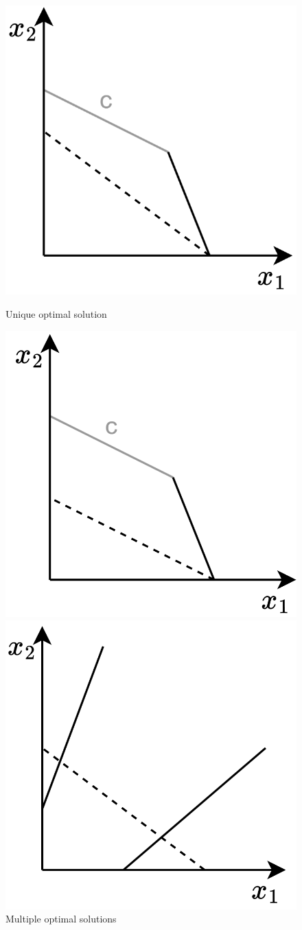 \begin{figure}[H] 
    \begin{minipage}[b]{0.5\linewidth}
      \centering
      \includegraphics[width=.5\linewidth]{images/un.png} 
      \caption{Unique optimal solution} 
      \vspace{4ex}
    \end{minipage}%
    \begin{minipage}[b]{0.5\linewidth}
      \centering
      \includegraphics[width=.5\linewidth]{images/mul.png} 
      \caption{Multiple optimal solutions} 
      \vspace{4ex}
    \end{minipage} 
    \begin{minipage}[b]{0.5\linewidth}
      \centering
      \includegraphics[width=.5\linewidth]{images/unb.png} 

\end{minipage}
\end{figure}
